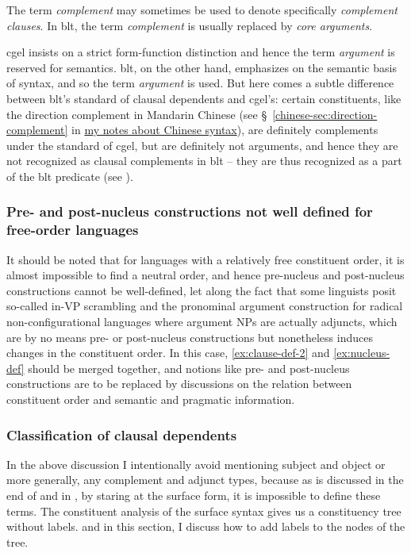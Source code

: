 \documentclass{article}
\newcommand*{\citesec}[1]{\S~{#1}}
\newcommand*{\term}[1]{\emph{#1}}
\newcommand{\chinese}{\href{../Chinese/main.pdf}{my notes about Chinese syntax}}
\begin{document}
The term \term{complement} may sometimes be used to denote specifically \term{complement clauses}. %
In \ac{blt}, the term \term{complement} is usually replaced by \term{core arguments}.

\ac{cgel} insists on a strict form-function distinction 
and hence the term \term{argument} is reserved for semantics.
\ac{blt}, on the other hand, emphasizes on the semantic basis of syntax, 
and so the term \term{argument} is used.
But here comes a subtle difference between \ac{blt}'s standard of clausal dependents and \ac{cgel}'s:
certain constituents, like the direction complement in Mandarin Chinese 
(see \citesec{\ref{chinese-sec:direction-complement}} in \chinese),
are definitely complements under the standard of \ac{cgel},
but are definitely not arguments, 
and hence they are not recognized as clausal complements in \ac{blt}
-- they are thus recognized as a part of the \ac{blt} predicate (see ).

\subsubsection{Pre- and post-nucleus constructions not well defined for free-order languages}\label{sec:free-order-blt}

It should be noted that for languages with a relatively free constituent order,
it is almost impossible to find a neutral order, 
and hence pre-nucleus and post-nucleus constructions 
cannot be well-defined,
let along the fact that some linguists posit so-called in-VP scrambling
and the pronominal argument construction for radical non-configurational languages
where argument NPs are actually adjuncts,
which are by no means pre- or post-nucleus constructions 
but nonetheless induces changes in the constituent order.
In this case, \eqref{ex:clause-def-2} and \eqref{ex:nucleus-def} should be merged together,
and notions like pre- and post-nucleus constructions are to be replaced by 
discussions on the relation between constituent order and semantic and pragmatic information.

\subsubsection{Classification of clausal dependents}\label{sec:complement-type-necessary}

In the above discussion I intentionally avoid mentioning subject and object
or more generally, any complement and adjunct types,
because as is discussed in the end of 
and in ,
by staring at the surface form,
it is impossible to define these terms.
The constituent analysis of the surface syntax 
gives us a constituency tree without labels.
and in this section, I discuss how to add labels to the nodes of the tree.
\end{document}
